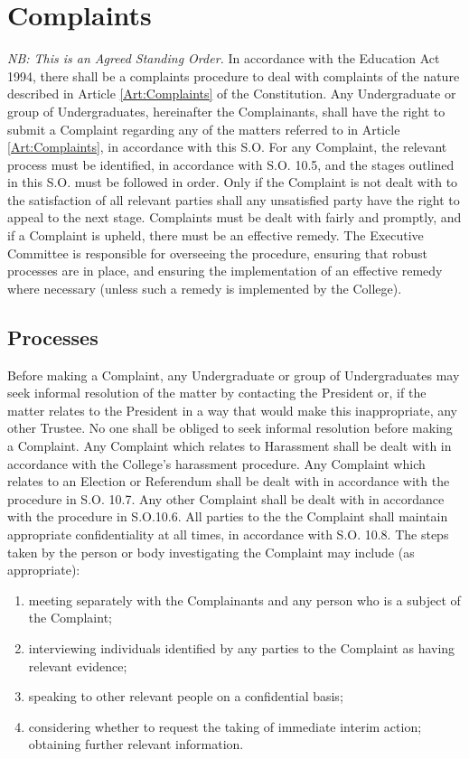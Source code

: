 \chapter{Complaints}
\textit{NB: This is an Agreed Standing Order.}
\npara In accordance with the Education Act 1994, there shall be a complaints procedure to deal with complaints of the nature described in Article \ref{Art:Complaints} of the Constitution.
\npara Any Undergraduate or group of Undergraduates, hereinafter the Complainants, shall have the right to submit a Complaint regarding any of the matters referred to in Article \ref{Art:Complaints}, in accordance with this S.O.
\npara For any Complaint, the relevant process must be identified, in accordance with S.O. 10.5, and the stages outlined in this S.O. must be followed in order.  Only if the Complaint is not dealt with to the satisfaction of all relevant parties shall any unsatisfied party have the right to appeal to the next stage.
\npara Complaints must be dealt with fairly and promptly, and if a Complaint is upheld, there must be an effective remedy.  The Executive Committee is responsible for overseeing the procedure, ensuring that robust processes are in place, and ensuring the implementation of an effective remedy where necessary (unless such a remedy is implemented by the College).
\section{Processes}
\npara Before making a Complaint, any Undergraduate or group of Undergraduates may seek informal resolution of the matter by contacting the President or, if the matter relates to the President in a way that would make this inappropriate, any other Trustee.  No one shall be obliged to seek informal resolution before making a Complaint.
\npara Any Complaint which relates to Harassment shall be dealt with in accordance with the College's harassment procedure.
\npara Any Complaint which relates to an Election or Referendum shall be dealt with in accordance with the procedure in S.O. 10.7.
\npara Any other Complaint shall be dealt with in accordance with the procedure in S.O.10.6.
\npara All parties to the the Complaint shall maintain appropriate confidentiality at all times, in accordance with S.O. 10.8.
\npara The steps taken by the person or body investigating the Complaint may include (as appropriate):
\begin{enumerate}
\item meeting separately with the Complainants and any person who is a subject of the Complaint;
\item interviewing individuals identified by any parties to the Complaint as having relevant evidence;
\item speaking to other relevant people on a confidential basis;
\item considering whether to request the taking of immediate interim action;
obtaining further relevant information.
\end{enumerate}
